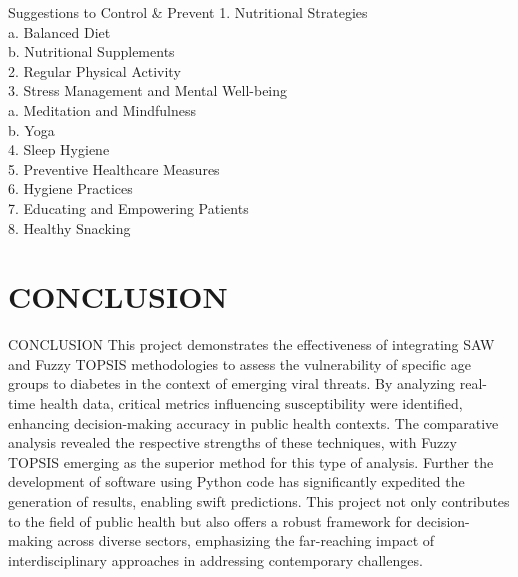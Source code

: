 \documentclass[serif, aspectratio=169]{beamer}
\newtheorem{thm co}{Theorem contd...}
\begin{document}
\begin{frame}{Suggestions to Control \&  Prevent}
    1. Nutritional Strategies\\
	\qquad	a. Balanced Diet\\
	\qquad	b. Nutritional Supplements\\
2. Regular Physical Activity\\
3. Stress Management and Mental Well-being\\
	\qquad	a. Meditation and Mindfulness\\
	\qquad	b. Yoga \\
4. Sleep Hygiene\\
5. Preventive Healthcare Measures\\
6. Hygiene Practices\\
7. Educating and Empowering Patients\\
8. Healthy Snacking\\

\end{frame}
\section{CONCLUSION}
\begin{frame}{CONCLUSION}
\hspace{1em}This project demonstrates the effectiveness of integrating SAW and Fuzzy TOPSIS methodologies to assess the vulnerability of specific age groups to diabetes in the
context of emerging viral threats. By analyzing real-time health data, critical metrics
influencing susceptibility were identified, enhancing decision-making accuracy in public
health contexts. The comparative analysis revealed the respective strengths of these
techniques, with Fuzzy TOPSIS emerging as the superior method for this type of analysis. Further the development of software using Python code has significantly expedited
the generation of results, enabling swift predictions. This project not only contributes
to the field of public health but also offers a robust framework for decision-making across
diverse sectors, emphasizing the far-reaching impact of interdisciplinary approaches in
addressing contemporary challenges.
\end{frame}
\end{document}
